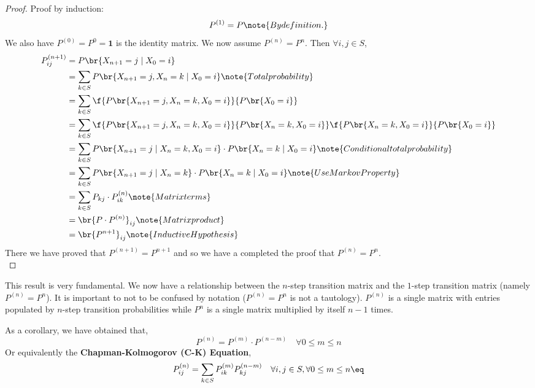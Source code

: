 \documentclass{article}
\newcommand{\ind}{\mathbf{1}}
\begin{document}
\begin{proof}
Proof by induction:
\[ P^{(1)} = P \note{By definition.} \]
We also have $P^{(0)} = P^{0} = \ind$ is the identity matrix. We now assume $P^{(n)} = P^{n}$. Then $\forall i,j \in S$,
\begin{align*}
    P_{ij}^{(n+1)} &= P\br{X_{n+1} = j \mid X_{0} = i} \\
    &= \sum_{k \in S} P\br{X_{n+1} = j, X_{n} = k \mid X_{0} = i} \note{Total probability}\\
    &= \sum_{k \in S} \f{P\br{X_{n+1} = j, X_{n} = k, X_{0} = i}}{P\br{X_{0} = i}} \\
    &= \sum_{k \in S} \f{P\br{X_{n+1} = j, X_{n} = k, X_{0} = i}}{P\br{X_{n} = k, X_{0} = i}}\f{P\br{X_{n} = k, X_{0} = i}}{P\br{X_{0} = i}} \\
    &= \sum_{k \in S} P\br{X_{n+1} = j \mid X_{n} = k, X_{0} = i} \cdot P\br{X_{n} = k \mid X_{0} = i} \note{Conditional total probability}\\
    &= \sum_{k \in S} P\br{X_{n+1} = j \mid X_{n} = k} \cdot P\br{X_{n} = k \mid X_{0} = i} \note{Use Markov Property}\\
    &= \sum_{k \in S} P_{kj} \cdot P_{ik}^{(n)} \note{Matrix terms}\\
    &= \br{P \cdot P^{(n)}}_{ij} \note{Matrix product}\\
    &= \br{P^{n+1}}_{ij} \note{Inductive Hypothesis}
\end{align*}
There we have proved that $P^{(n+1)} = P^{n+1}$ and so we have a completed the proof that $P^{(n)} = P^{n}$.\\
\end{proof}

This result is very fundamental. We now have a relationship between the $n$-step transition matrix and the $1$-step transition matrix (namely $P^{(n)} = P^n$). It is important to not to be confused by notation ($P^{(n)} = P^n$ is not a tautology). $P^{(n)}$ is a single matrix with entries populated by $n$-step transition probabilities while $P^n$ is a single matrix multiplied by itself $n-1$ times.

\begin{corollary}
As a corollary, we have obtained that,
\[ P^{(n)} = P^{(m)} \cdot P^{(n-m)} \quad \forall 0 \leq m \leq n \]
Or equivalently the \textbf{Chapman-Kolmogorov (C-K) Equation},
\[ P^{(n)}_{ij} = \sum_{k \in S} P^{(m)}_{ik} P^{(n-m)}_{kj} \quad \forall i,j \in S, \forall 0 \leq m \leq n \eq \label{eq:ck_equation} \]
\end{corollary}
\end{document}
